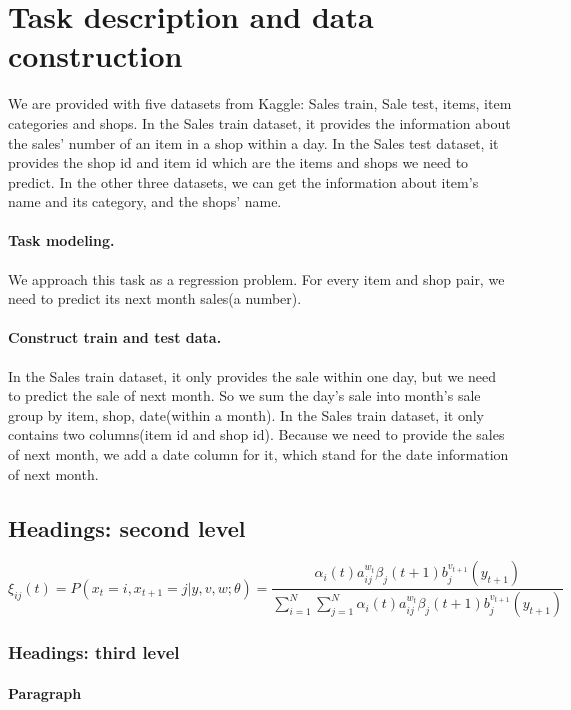 \documentclass{article}
\begin{document}
\newpage
\appendix
\section{Task description and data construction}
\label{sec:headings}
We are provided with five datasets from Kaggle: Sales train, Sale test, items, item categories and shops. In the Sales train dataset, it provides the information about the sales’ number of an item in a shop within a day. In the Sales test dataset, it provides the shop id and item id which are the items and shops we need to predict. In the other three datasets, we can get the information about item’s name and its category, and the shops’ name.
\paragraph{Task modeling.}
We approach this task as a regression problem. For every item and shop pair, we need to predict its next month sales(a number).
\paragraph{Construct train and test data.}
In the Sales train dataset, it only provides the sale within one day, but we need to predict the sale of next month. So we sum the day's sale into month's sale group by item, shop, date(within a month).
In the Sales train dataset, it only contains two columns(item id and shop id). Because we need to provide the sales of next month, we add a date column for it, which stand for the date information of next month.

\subsection{Headings: second level}
\lipsum[5]
\begin{equation}
\xi _{ij}(t)=P(x_{t}=i,x_{t+1}=j|y,v,w;\theta)= {\frac {\alpha _{i}(t)a^{w_t}_{ij}\beta _{j}(t+1)b^{v_{t+1}}_{j}(y_{t+1})}{\sum _{i=1}^{N} \sum _{j=1}^{N} \alpha _{i}(t)a^{w_t}_{ij}\beta _{j}(t+1)b^{v_{t+1}}_{j}(y_{t+1})}}
\end{equation}

\subsubsection{Headings: third level}
\lipsum[6]

\paragraph{Paragraph}
\lipsum[7]
\end{document}
